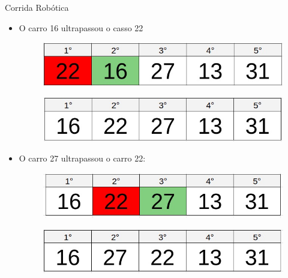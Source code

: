 \documentclass{beamer}
\begin{document}
\begin{frame}{Corrida Robótica}
\begin{itemize}
    \item O carro 16 ultrapassou o casso 22
        \begin{figure}[ht]
        \centering
        \includegraphics[width=.6\textwidth]{1622.jpeg}
        \label{fig:exampleFig2}
        \end{figure}
        \begin{figure}[ht]
        \centering
        \includegraphics[width=.6\textwidth]{16222.jpeg}
        \label{fig:exampleFig2}
        \end{figure}
    \item O carro 27 ultrapassou o carro 22:
        \begin{figure}[ht]
        \centering
        \includegraphics[width=.6\textwidth]{2722.jpeg}
        \label{fig:exampleFig2}
        \end{figure}
        \begin{figure}[ht]
        \centering
        \includegraphics[width=.6\textwidth]{27222.jpeg}
        \label{fig:exampleFig2}
        \end{figure}
\end{itemize}
\end{frame}
\end{document}
